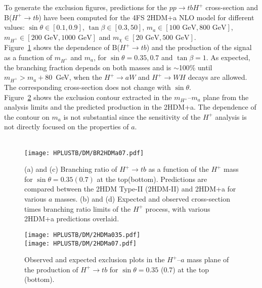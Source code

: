 To generate the exclusion figures, predictions for the $pp\to tbH^+$ cross-section and B($H^+\to tb$) have been computed for the 4FS 2HDM+a NLO model for different values: $\sin\theta\in[0.1,0.9]$, $\tan\beta\in[0.3,50]$, $m_a\in[100\text{ GeV},800\text{ GeV}]$, $m_{H^+}\in[200\text{ GeV},1000\text{ GeV}]$ and $m_\chi\in[20\text{ GeV},500\text{ GeV}]$.\\

Figure~\ref{Hplustb:BRprodexclmassvsmass} shows the dependence of B($H^+\to tb$) and the production of the signal as a function of $m_{H^+}$ and $m_a$, for $\sin\theta=0.35,0.7$ and $\tan\beta=1$. As expected, the branching fraction depends on both masses and is $\sim$100\% until $m_{H^+} > m_a+80$~GeV, when the $H^+\to aW$ and $H^+\to WH$ decays are allowed. The corresponding cross-section does not change with $\sin\theta$.\\

Figure~\ref{Hplustb:exclvsmass} shows the exclusion contour extracted in the $m_{H^+}$--$m_a$ plane from the analysis limits and the predicted production in the 2HDM+a. The dependence of the contour on $m_a$ is not substantial since the sensitivity of the $H^+$ analysis is not directly focused on the properties of $a$.\\

\begin{figure}[htb]
    \RawFloats
    \centering
        \\
       {\texttt{[image: HPLUSTB/DM/BR2HDMa07.pdf]}} 
    \caption{(a) and (c) Branching ratio of $H^+\to tb$ as a function of the $H^+$ mass for $\sin\theta=0.35(0.7)$ at the top(bottom). Predictions are compared between the 2HDM Type-II (2HDM-II) and 2HDM+a for various $a$ masses. (b) and (d) Expected and observed cross-section times branching ratio limits of the $H^+$ process, with various 2HDM+a predictions overlaid.}
    \label{Hplustb:BRprodexclmassvsmass}
\end{figure}

\begin{figure}[htb]
    \RawFloats
    \centering
       {\texttt{[image: HPLUSTB/DM/2HDMa035.pdf]}} \\
       {\texttt{[image: HPLUSTB/DM/2HDMa07.pdf]}} 
    \caption{Observed and expected exclusion plots in the $H^+$--$a$ mass plane of the production of $H^+\to tb$ for $\sin\theta=0.35$ (0.7) at the top (bottom).}
    \label{Hplustb:exclvsmass}
\end{figure}

